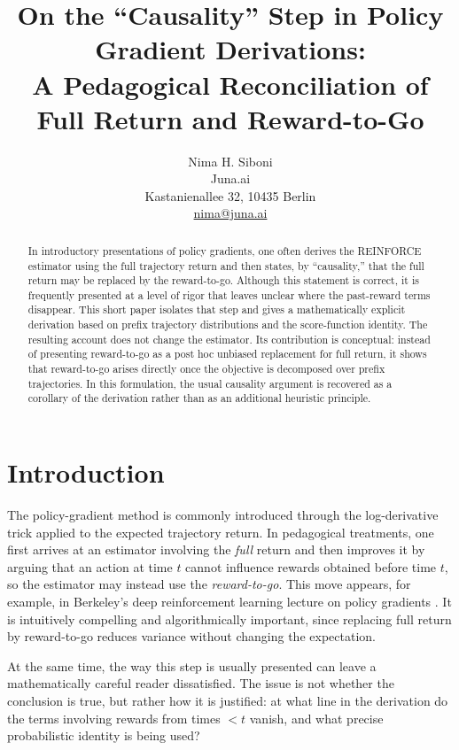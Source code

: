 \documentclass[11pt]{article}
\title{On the ``Causality'' Step in Policy Gradient Derivations: \\
A Pedagogical Reconciliation of Full Return and Reward-to-Go}
\author{Nima H. Siboni \\
Juna.ai \\
Kastanienallee 32, 10435 Berlin \\
\href{mailto:nima@juna.ai}{nima@juna.ai}}
\date{}
\begin{document}
\maketitle

\begin{abstract}
In introductory presentations of policy gradients, one often derives the REINFORCE estimator using the full trajectory return and then states, by ``causality,'' that the full return may be replaced by the reward-to-go. Although this statement is correct, it is frequently presented at a level of rigor that leaves unclear where the past-reward terms disappear. This short paper isolates that step and gives a mathematically explicit derivation based on prefix trajectory distributions and the score-function identity. The resulting account does not change the estimator. Its contribution is conceptual: instead of presenting reward-to-go as a post hoc unbiased replacement for full return, it shows that reward-to-go arises directly once the objective is decomposed over prefix trajectories. In this formulation, the usual causality argument is recovered as a corollary of the derivation rather than as an additional heuristic principle.
\end{abstract}

\section{Introduction}
The policy-gradient method is commonly introduced through the log-derivative trick applied to the expected trajectory return. In pedagogical treatments, one first arrives at an estimator involving the \emph{full} return and then improves it by arguing that an action at time $t$ cannot influence rewards obtained before time $t$, so the estimator may instead use the \emph{reward-to-go}. This move appears, for example, in Berkeley's deep reinforcement learning lecture on policy gradients \cite{berkeley}. It is intuitively compelling and algorithmically important, since replacing full return by reward-to-go reduces variance without changing the expectation.

At the same time, the way this step is usually presented can leave a mathematically careful reader dissatisfied. The issue is not whether the conclusion is true, but rather how it is justified: at what line in the derivation do the terms involving rewards from times $< t$ vanish, and what precise probabilistic identity is being used?
\end{document}
